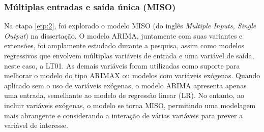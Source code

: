 \subsubsection{M\'ultiplas entradas e sa\'ida \'unica (MISO)}

Na etapa \ref{etp:2}, foi explorado o modelo MISO (do inglês \textit{Multiple Inputs, Single Output}) na dissertação. O modelo ARIMA, juntamente com suas variantes e extensões, foi amplamente estudado durante a pesquisa, assim como modelos regressivos que envolvem múltiplas variáveis de entrada e uma variável de saída, neste caso, a LT01. As demais variáveis foram utilizadas como suporte para melhorar o modelo do tipo ARIMAX ou modelos com variáveis exógenas. Quando aplicado sem o uso de variáveis exógenas, o modelo ARIMA apresenta apenas uma entrada, semelhante ao modelo de regressão linear (LR). No entanto, ao incluir variáveis exógenas, o modelo se torna MISO, permitindo uma modelagem mais abrangente e considerando a interação de várias variáveis para prever a variável de interesse.